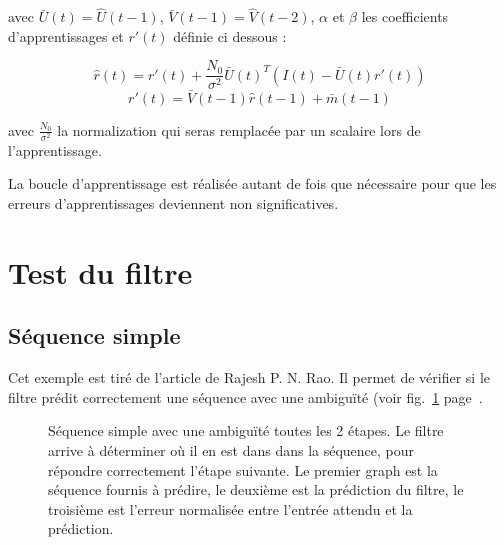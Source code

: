 avec $\bar{U}(t) = \hat{U}(t-1)$, $\bar{V}(t-1) = \hat{V}(t-2)$, $\alpha$ et $\beta$
les coefficients d'apprentissages et $r'(t)$ définie ci dessous :

\begin{equation}
   \label{eqn:def_r_hat}
   \hat{r}(t) = r'(t) + \frac{N_0}{\sigma^2}\bar{U}(t)^T(I(t)-\bar{U}(t)r'(t))
\end{equation}
\begin{equation}
   \label{eqn:def_r_prime}
   r'(t) =  \bar{V}(t-1)\hat{r}(t-1) + \bar{m}(t-1)
\end{equation}

avec $\frac{N_0}{\sigma^2}$ la normalization qui seras remplacée par un scalaire lors
de l'apprentissage.

La boucle d'apprentissage est réalisée autant de fois que nécessaire pour que
les erreurs d'apprentissages deviennent non significatives.



\section{Test du filtre} %
\label{sec:Test du filtre}

\subsection{Séquence simple} %
\label{sub:Sequence simple}

Cet exemple est tiré de l'article de Rajesh P. N. Rao. Il permet de vérifier si
le filtre prédit correctement une séquence avec une ambiguïté (voir
fig.~\ref{fig:sequence_simple} page~\pageref{fig:sequence_simple}.

\begin{figure}[ht]
   \begin{center}
   \end{center}
   \caption[Prédiction de séquence simple]{Séquence simple avec une ambiguïté
   toutes les 2 étapes. Le filtre arrive à déterminer où il en est dans dans la
   séquence, pour répondre correctement l'étape suivante. Le premier graph est
   la séquence fournis à prédire, le deuxième est la prédiction du filtre, le
   troisième est l'erreur normalisée entre l'entrée attendu et la prédiction.}
   \label{fig:sequence_simple}
\end{figure}

